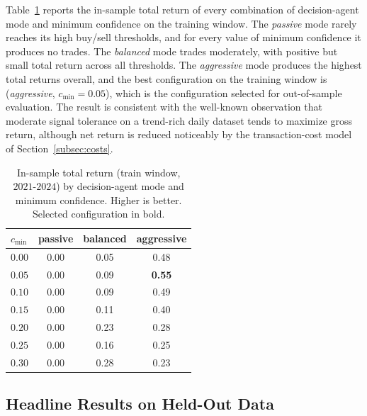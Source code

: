 \documentclass{ieeeaccess}
\newcommand{\BestMinConf}{\ensuremath{0.05}}
\begin{document}
Table~\ref{tab:grid_train} reports the in-sample total return of every combination of decision-agent mode and minimum confidence on the training window. The \emph{passive} mode rarely reaches its high buy/sell thresholds, and for every value of minimum confidence it produces no trades. The \emph{balanced} mode trades moderately, with positive but small total return across all thresholds. The \emph{aggressive} mode produces the highest total returns overall, and the best configuration on the training window is (\emph{aggressive}, $c_{\min} = \BestMinConf{}$), which is the configuration selected for out-of-sample evaluation. The result is consistent with the well-known observation that moderate signal tolerance on a trend-rich daily dataset tends to maximize gross return, although net return is reduced noticeably by the transaction-cost model of Section~\ref{subsec:costs}.

\begin{table}[t]
\centering
\caption{In-sample total return (train window, $2021$-$2024$) by decision-agent mode and minimum confidence. Higher is better. Selected configuration in bold.}
\label{tab:grid_train}
\begin{tabular}{lccc}
\toprule
$c_{\min}$ & passive & balanced & aggressive \\
\midrule
$0.00$ & 0.00 & 0.05 & 0.48 \\
$0.05$ & 0.00 & 0.09 & \textbf{0.55} \\
$0.10$ & 0.00 & 0.09 & 0.49 \\
$0.15$ & 0.00 & 0.11 & 0.40 \\
$0.20$ & 0.00 & 0.23 & 0.28 \\
$0.25$ & 0.00 & 0.16 & 0.25 \\
$0.30$ & 0.00 & 0.28 & 0.23 \\
\bottomrule
\end{tabular}
\end{table}

\subsection{Headline Results on Held-Out Data}
\label{subsec:headline}
\end{document}
